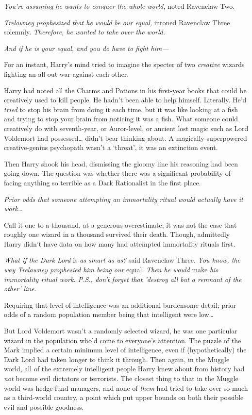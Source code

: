 \emph{You're assuming he wants to conquer the whole world,} noted Ravenclaw Two.

\emph{Trelawney prophesized that he would be our equal,} intoned Ravenclaw 
Three solemnly. \emph{Therefore, he wanted to take over the world.}

\emph{And if he is your equal, and you do have to fight him---}

For an instant, Harry's mind tried to imagine the specter of two 
\emph{creative} wizards fighting an all-out-war against each other.

Harry had noted all the Charms and Potions in his first-year books that could 
be creatively used to kill people. He hadn't been able to help himself. 
Literally. He'd \emph{tried} to stop his brain from doing it each time, but it 
was like looking at a fish and trying to stop your brain from noticing it was a 
fish. What someone could creatively do with seventh-year, or Auror-level, or 
ancient lost magic such as Lord Voldemort had possessed{\ldots} didn't bear 
thinking about. A magically-superpowered creative-genius psychopath wasn't a 
`threat', it was an extinction event.

Then Harry shook his head, dismissing the gloomy line his reasoning had been 
going down. The question was whether there was a significant probability of 
facing anything so terrible as a Dark Rationalist in the first place.

\emph{Prior odds that someone attempting an immortality ritual would actually 
have it work{\ldots}}

Call it one to a thousand, at a generous overestimate; it was not the case that 
roughly one wizard in a thousand survived their death. Though, admittedly Harry 
didn't have data on how many had attempted immortality rituals first.

\emph{What if the Dark Lord} is \emph{as smart as us?} said Ravenclaw Three. 
\emph{You know, the way Trelawney prophesied him being our} equal. \emph{Then 
he would} make \emph{his immortality ritual work. P.S., don't forget that 
'destroy all but a remnant of the other' line.}

Requiring that level of intelligence was an additional burdensome detail; prior 
odds of a random population member being that intelligent were low{\ldots}

But Lord Voldemort wasn't a randomly selected wizard, he was one particular 
wizard in the population who'd come to everyone's attention. The puzzle of the 
Mark implied a certain minimum level of intelligence, even if (hypothetically) 
the Dark Lord had taken longer to think it through. Then again, in the Muggle 
world, all of the extremely intelligent people Harry knew about from history 
had \emph{not} become evil dictators or terrorists. The closest thing to that 
in the Muggle world was hedge-fund managers, and none of \emph{them} had tried 
to take over so much as a third-world country, a point which put upper bounds 
on both their possible evil and possible goodness.

